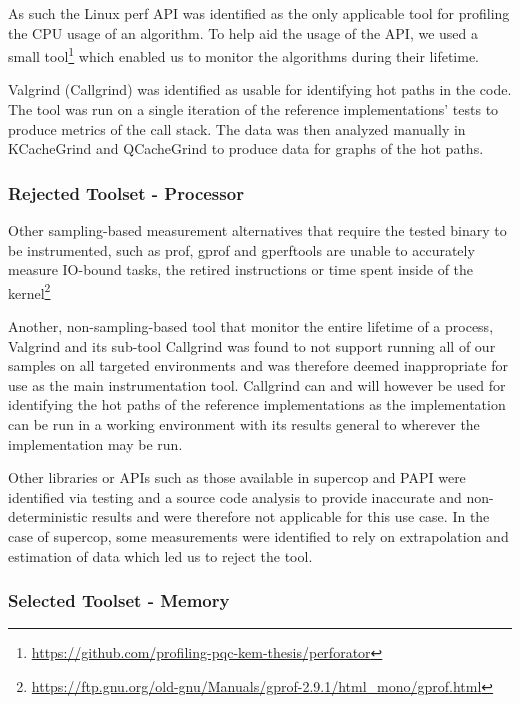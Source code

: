 As such the Linux perf API was identified as the only applicable tool for profiling the CPU usage of an algorithm. To help aid the usage of the API, we used a small tool\footnote{\href{https://github.com/profiling-pqc-kem-thesis/perforator}{https://github.com/profiling-pqc-kem-thesis/perforator}} which enabled us to monitor the algorithms during their lifetime.

Valgrind (Callgrind) was identified as usable for identifying hot paths in the code. The tool was run on a single iteration of the reference implementations' tests to produce metrics of the call stack. The data was then analyzed manually in KCacheGrind and QCacheGrind to produce data for graphs of the hot paths.

\subsubsection{Rejected Toolset - Processor}
\label{section:method:experiment:phase1:rejected-toolset-processor}
Other sampling-based measurement alternatives that require the tested binary to be instrumented, such as prof, gprof and gperftools are unable to accurately measure IO-bound tasks, the retired instructions or time spent inside of the kernel\footnote{\href{https://ftp.gnu.org/old-gnu/Manuals/gprof-2.9.1/html\_mono/gprof.html}{https://ftp.gnu.org/old-gnu/Manuals/gprof-2.9.1/html\_mono/gprof.html}}

Another, non-sampling-based tool that monitor the entire lifetime of a process, Valgrind and its sub-tool Callgrind was found to not support running all of our samples on all targeted environments and was therefore deemed inappropriate for use as the main instrumentation tool. Callgrind can and will however be used for identifying the hot paths of the reference implementations as the implementation can be run in a working environment with its results general to wherever the implementation may be run.

Other libraries or APIs such as those available in \gls{supercop} and PAPI were identified via testing and a source code analysis to provide inaccurate and non-deterministic results and were therefore not applicable for this use case. In the case of \gls{supercop}, some measurements were identified to rely on extrapolation and estimation of data which led us to reject the tool.

\subsubsection{Selected Toolset - Memory}
\label{section:method:experiment:phase1:selected-toolset-memory}

